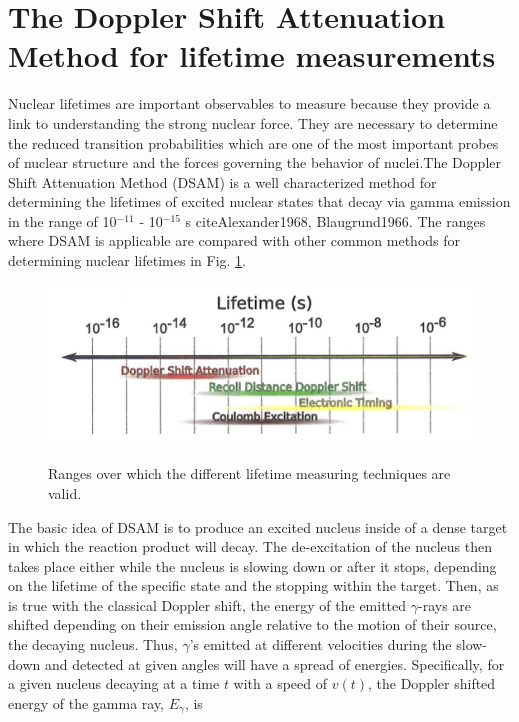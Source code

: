 \section{The Doppler Shift Attenuation Method for lifetime measurements}
\label{sec: dsam-intro}


Nuclear lifetimes are important observables to measure because they provide a link to understanding the strong nuclear force. They are necessary to determine the reduced transition probabilities which are one of the most important probes of nuclear structure and the forces governing the behavior of nuclei.The Doppler Shift Attenuation Method (DSAM) is a well characterized method for determining the lifetimes of excited nuclear states that decay via gamma emission in the range of 10$^{-11}$ - 10$^{-15}$ s cite{Alexander1968, Blaugrund1966}. The ranges where DSAM is applicable are compared with other common methods for determining nuclear lifetimes in Fig. \ref{fig: lifetimeRanges}. 


\begin{figure}
\includegraphics[width=\linewidth]{figures/lifetimeTechniques.png}
\label{fig: lifetimeRanges}
\caption{Ranges over which the different lifetime measuring techniques are valid.}
\end{figure}


The basic idea of DSAM is to produce an excited nucleus inside of a dense target in which the reaction product will decay. The de-excitation of the nucleus then takes place either while the nucleus is slowing down or after it stops, depending on the lifetime of the specific state and the stopping within the target. Then, as is true with the classical Doppler shift, the energy of the emitted $\gamma$-rays are shifted depending on their emission angle relative to the motion of their source, the decaying nucleus. Thus, $\gamma$'s emitted at different velocities during the slow-down and detected at given angles will have a spread of energies. Specifically, for a given nucleus decaying at a time $t$ with a speed of $v(t)$, the Doppler shifted energy of the gamma ray, $E_{\gamma}$, is 

